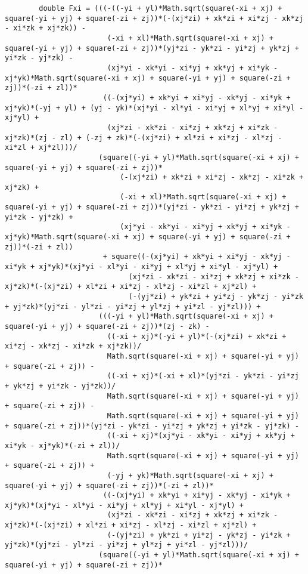 \begin{lstlisting}
		double Fxi = (((-((-yi + yl)*Math.sqrt(square(-xi + xj) + square(-yi + yj) + square(-zi + zj))*(-(xj*zi) + xk*zi + xi*zj - xk*zj - xi*zk + xj*zk)) - 
						(-xi + xl)*Math.sqrt(square(-xi + xj) + square(-yi + yj) + square(-zi + zj))*(yj*zi - yk*zi - yi*zj + yk*zj + yi*zk - yj*zk) - 
						(xj*yi - xk*yi - xi*yj + xk*yj + xi*yk - xj*yk)*Math.sqrt(square(-xi + xj) + square(-yi + yj) + square(-zi + zj))*(-zi + zl))*
					   ((-(xj*yi) + xk*yi + xi*yj - xk*yj - xi*yk + xj*yk)*(-yj + yl) + (yj - yk)*(xj*yi - xl*yi - xi*yj + xl*yj + xi*yl - xj*yl) + 
						(xj*zi - xk*zi - xi*zj + xk*zj + xi*zk - xj*zk)*(zj - zl) + (-zj + zk)*(-(xj*zi) + xl*zi + xi*zj - xl*zj - xi*zl + xj*zl)))/
					  (square((-yi + yl)*Math.sqrt(square(-xi + xj) + square(-yi + yj) + square(-zi + zj))*
						   (-(xj*zi) + xk*zi + xi*zj - xk*zj - xi*zk + xj*zk) + 
						   (-xi + xl)*Math.sqrt(square(-xi + xj) + square(-yi + yj) + square(-zi + zj))*(yj*zi - yk*zi - yi*zj + yk*zj + yi*zk - yj*zk) + 
						   (xj*yi - xk*yi - xi*yj + xk*yj + xi*yk - xj*yk)*Math.sqrt(square(-xi + xj) + square(-yi + yj) + square(-zi + zj))*(-zi + zl))
					   + square((-(xj*yi) + xk*yi + xi*yj - xk*yj - xi*yk + xj*yk)*(xj*yi - xl*yi - xi*yj + xl*yj + xi*yl - xj*yl) + 
							 (xj*zi - xk*zi - xi*zj + xk*zj + xi*zk - xj*zk)*(-(xj*zi) + xl*zi + xi*zj - xl*zj - xi*zl + xj*zl) + 
							 (-(yj*zi) + yk*zi + yi*zj - yk*zj - yi*zk + yj*zk)*(yj*zi - yl*zi - yi*zj + yl*zj + yi*zl - yj*zl))) + 
					  (((-yi + yl)*Math.sqrt(square(-xi + xj) + square(-yi + yj) + square(-zi + zj))*(zj - zk) - 
						((-xi + xj)*(-yi + yl)*(-(xj*zi) + xk*zi + xi*zj - xk*zj - xi*zk + xj*zk))/
						Math.sqrt(square(-xi + xj) + square(-yi + yj) + square(-zi + zj)) - 
						((-xi + xj)*(-xi + xl)*(yj*zi - yk*zi - yi*zj + yk*zj + yi*zk - yj*zk))/
						Math.sqrt(square(-xi + xj) + square(-yi + yj) + square(-zi + zj)) - 
						Math.sqrt(square(-xi + xj) + square(-yi + yj) + square(-zi + zj))*(yj*zi - yk*zi - yi*zj + yk*zj + yi*zk - yj*zk) - 
						((-xi + xj)*(xj*yi - xk*yi - xi*yj + xk*yj + xi*yk - xj*yk)*(-zi + zl))/
						Math.sqrt(square(-xi + xj) + square(-yi + yj) + square(-zi + zj)) + 
						(-yj + yk)*Math.sqrt(square(-xi + xj) + square(-yi + yj) + square(-zi + zj))*(-zi + zl))*
					   ((-(xj*yi) + xk*yi + xi*yj - xk*yj - xi*yk + xj*yk)*(xj*yi - xl*yi - xi*yj + xl*yj + xi*yl - xj*yl) + 
						(xj*zi - xk*zi - xi*zj + xk*zj + xi*zk - xj*zk)*(-(xj*zi) + xl*zi + xi*zj - xl*zj - xi*zl + xj*zl) + 
						(-(yj*zi) + yk*zi + yi*zj - yk*zj - yi*zk + yj*zk)*(yj*zi - yl*zi - yi*zj + yl*zj + yi*zl - yj*zl)))/
					  (square((-yi + yl)*Math.sqrt(square(-xi + xj) + square(-yi + yj) + square(-zi + zj))*

\end{lstlisting}
